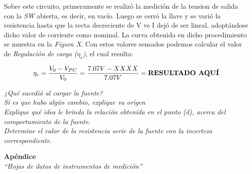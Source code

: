 \documentclass{article}
\begin{document}
\noindent Sobre este circuito, primeramente se realizó la medición de la tension de salida con la \textit{SW} abierta, es decir, en vacío. Luego se cerró la llave y se varió la resistencia hasta que la recta decreciente de V vs I dejó de ser lineal, adoptándose dicho valor de corriente como nominal. La curva obtenida en dicho procedimiento se muestra en la \textit{Figura X}. Con estos valores sensados podemos calcular el valor de \textit{Regulación de carga ($\eta_c$)}, el cual resulta:
\bigskip


\begin{equation}
 	\eta_c = {V_0 - V_{PC} \over V_0} = {7.07V - XXXX \over 7.07V} = \textbf{RESULTADO AQUÍ}
\end{equation}
\bigskip



\textit{¿Qué sucedió al cargar la fuente?} \\

\textit{Si es que hubo algún cambio, explique su origen} \\

\textit{Explique qué idea le brinda la relación obtenida en el punto (d), acerca del comportamiento de la fuente.} \\

\textit{Determine el valor de la resistencia serie de la fuente con la incerteza correspondiente.} \\


\newpage
\vspace*{4cm}
\begin{center}
	\textbf{\Huge{Apéndice}} \\
	\bigskip\bigskip
	\Large{\textit{``Hojas de datos de instrumentos de medición''}}
\end{center}
\end{document}
